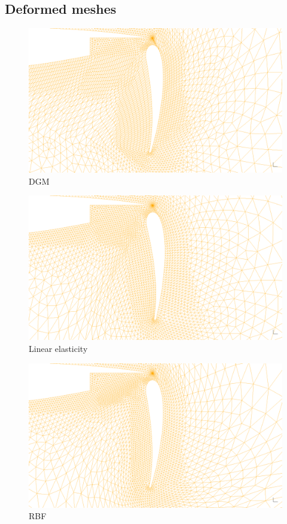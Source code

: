 \documentclass{article}
\begin{document}
\subsection{Deformed meshes}
\begin{figure}
\includegraphics[scale=0.18]{movedwing-dgm--60-2}
\caption{DGM}
\end{figure}
 
\begin{figure}
\includegraphics[scale=0.2]{movedwing-elast--60-2}
\caption{Linear elasticity}
\end{figure}
 

\begin{figure}
\includegraphics[scale=0.2]{movedwing-rbf--60-2}
\caption{RBF}
\end{figure}
 
\end{document}
